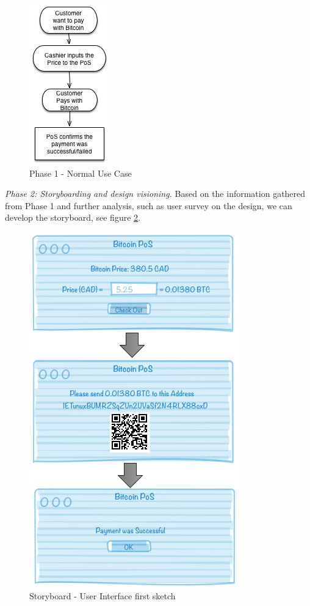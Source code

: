 \begin{figure}[htb!p]
\centering
\includegraphics[scale=0.7]{fig/RE_Scenario_Phase1.png}
  \caption{Phase 1 - Normal Use Case}
\label{fig:phase1}
\end{figure}


\textit{Phase 2: Storyboarding and design visioning.}
Based on the information gathered from Phase 1 and further analysis, such as user survey on the design, we can develop the storyboard, see figure \ref{fig:storyboard}.%

\begin{figure}[htb!p]
\centering
\includegraphics[scale=0.5]{fig/RE_Scenario_Interface.png}
  \caption{Storyboard - User Interface first sketch}
\label{fig:storyboard}
\end{figure}


